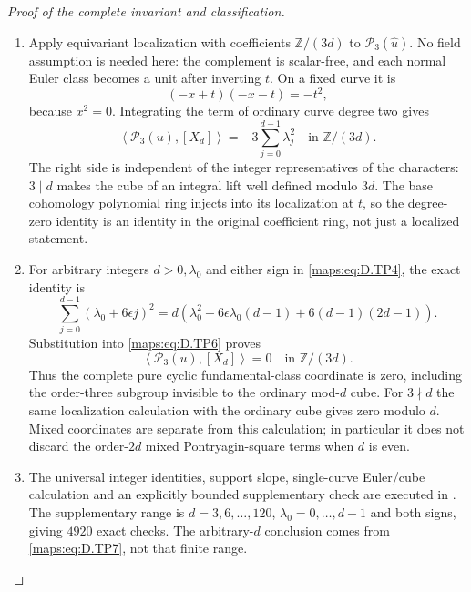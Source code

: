 \begin{proof}[Proof of the complete invariant and classification]
\begin{enumerate}[label=\arabic*.,leftmargin=*]
\item Apply equivariant localization with coefficients
$\mathbb Z/(3d)$ to $\mathcal P_3(\widehat u)$.
No field assumption is needed here: the complement
is scalar-free, and each normal Euler class becomes
a unit after inverting $t$. On a fixed curve it is
\[
                    (-x+t)(-x-t)=-t^2,
\]
because $x^2=0$. Integrating the term of ordinary
curve degree two gives
\[
 \left\langle\mathcal P_3(u),[X_d]\right\rangle
                      =-3\sum_{j=0}^{d-1}\lambda_j^2
                                  \quad\text{in }\mathbb Z/(3d).
                                                               \tag{D.TP6}\label{maps:eq:D.TP6}
\]
The right side is independent of the integer
representatives of the characters: $3\mid d$ makes
the cube of an integral lift well defined modulo
$3d$. The base cohomology polynomial ring injects
into its localization at $t$, so the degree-zero
identity is an identity in the original coefficient
ring, not just a localized statement.

\item For arbitrary integers $d>0,\lambda_0$ and either
sign in \eqref{maps:eq:D.TP4}, the exact identity is
\[
 \sum_{j=0}^{d-1}(\lambda_0+6\epsilon j)^2
   =d\left(\lambda_0^2+6\epsilon\lambda_0(d-1)
                         +6(d-1)(2d-1)\right).              \tag{D.TP7}\label{maps:eq:D.TP7}
\]
Substitution into \eqref{maps:eq:D.TP6} proves
\[
                 \left\langle\mathcal P_3(u),[X_d]\right\rangle=0
                                  \quad\text{in }\mathbb Z/(3d).
                                                               \tag{D.TP8}\label{maps:eq:D.TP8}
\]
Thus the complete pure cyclic fundamental-class coordinate
is zero, including the order-three subgroup invisible to
the ordinary mod-$d$ cube. For $3\nmid d$ the same
localization calculation with the ordinary cube gives
zero modulo $d$. Mixed coordinates are separate from
this calculation; in particular it does not discard
the order-$2d$ mixed Pontryagin-square terms when $d$
is even.

\item The universal integer identities, support slope,
single-curve Euler/cube calculation and an explicitly
bounded supplementary check are executed in
.
The supplementary range is $d=3,6,\ldots,120$,
$\lambda_0=0,\ldots,d-1$ and both signs, giving
$4920$ exact checks. The arbitrary-$d$ conclusion
comes from \eqref{maps:eq:D.TP7}, not that finite range.


\end{enumerate}
\end{proof}
